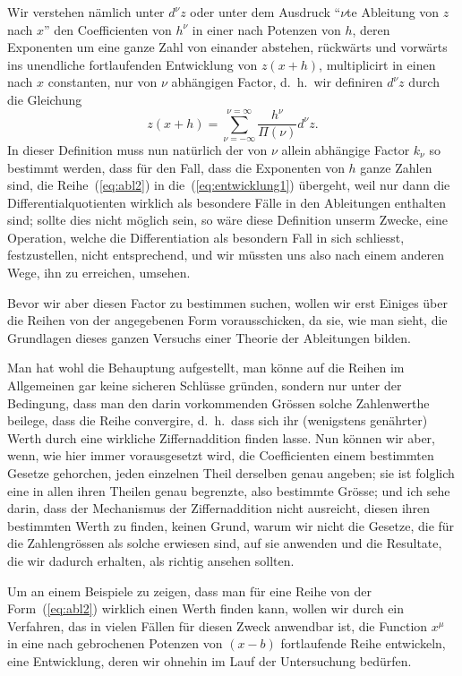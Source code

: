\documentclass[12pt,a4paper]{article}
\begin{document}
Wir verstehen n\"amlich unter $d^\nu z$ oder unter dem Ausdruck ``$\nu$te Ableitung von $z$ nach $x$'' den Coefficienten von $h^\nu$ in einer nach Potenzen von $h$, deren Exponenten um eine ganze Zahl von einander abstehen, r\"uckw\"arts und vorw\"arts ins unendliche fortlaufenden Entwicklung von $z(x+h)$, multiplicirt in einen nach $x$ constanten, nur von $\nu$ abh\"angigen Factor, d.\ h.\ wir definiren $d^\nu z$ durch die Gleichung
\begin{equation}\label{eq:abl2}
z(x+h) = \sum_{\nu=-\infty}^{\nu=\infty} \frac{h^\nu}{\Pi(\nu)} d^\nu z.
\end{equation}
In dieser Definition muss nun nat\"urlich der von $\nu$ allein abh\"angige Factor $k_\nu$ so bestimmt werden, dass f\"ur den Fall, dass die Exponenten von $h$ ganze Zahlen sind, die Reihe~(\ref{eq:abl2}) in die~(\ref{eq:entwicklung1}) \"ubergeht, weil nur dann die Differentialquotienten wirklich als besondere F\"alle in den Ableitungen enthalten sind; sollte dies nicht m\"oglich sein, so w\"are diese Definition unserm Zwecke, eine Operation, welche die Differentiation als besondern Fall in sich schliesst, festzustellen, nicht entsprechend, und wir m\"ussten uns also nach einem anderen Wege, ihn zu erreichen, umsehen.

\newpage

Bevor wir aber diesen Factor zu bestimmen suchen, wollen wir erst Einiges \"uber die Reihen von der angegebenen Form vorausschicken, da sie, wie man sieht, die Grundlagen dieses ganzen Versuchs einer Theorie der Ableitungen bilden.

Man hat wohl die Behauptung aufgestellt, man k\"onne auf die Reihen im Allgemeinen gar keine sicheren Schl\"usse gr\"unden, sondern nur unter der Bedingung, dass man den darin vorkommenden Gr\"ossen solche Zahlenwerthe beilege, dass die Reihe convergire, d.\ h.\ dass sich ihr (wenigstens gen\"ahrter) Werth durch eine wirkliche Ziffernaddition finden lasse. Nun k\"onnen wir aber, wenn, wie hier immer vorausgesetzt wird, die Coefficienten einem bestimmten Gesetze gehorchen, jeden einzelnen Theil derselben genau angeben; sie ist folglich eine in allen ihren Theilen genau begrenzte, also bestimmte Gr\"osse; und ich sehe darin, dass der Mechanismus der Ziffernaddition nicht ausreicht, diesen ihren bestimmten Werth zu finden, keinen Grund, warum wir nicht die Gesetze, die f\"ur die Zahlengr\"ossen als solche erwiesen sind, auf sie anwenden und die Resultate, die wir dadurch erhalten, als richtig ansehen sollten.

Um an einem Beispiele zu zeigen, dass man f\"ur eine Reihe von der Form~(\ref{eq:abl2}) wirklich einen Werth finden kann, wollen wir durch ein Verfahren, das in vielen F\"allen f\"ur diesen Zweck anwendbar ist, die Function $x^\mu$ in eine nach gebrochenen Potenzen von $(x-b)$ fortlaufende Reihe entwickeln, eine Entwicklung, deren wir ohnehin im Lauf der Untersuchung bed\"urfen.
\end{document}
